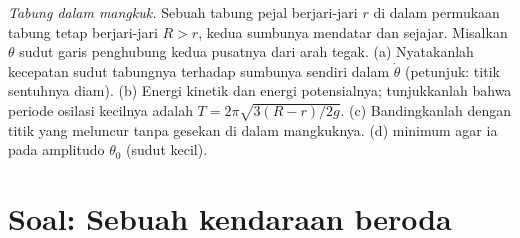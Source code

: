 \begin{exercise}[$\star\star\star$]\label{exo:b2:rigid-body-mechanics:12}
\emph{Tabung dalam mangkuk.} Sebuah tabung pejal berjari-jari $r$
 di dalam permukaan tabung tetap berjari-jari
$R > r$, kedua sumbunya mendatar dan sejajar. Misalkan $\theta$ sudut
garis penghubung kedua pusatnya dari arah tegak. (a) Nyatakanlah
kecepatan sudut tabungnya terhadap sumbunya sendiri dalam $\dot\theta$
(petunjuk: titik sentuhnya diam). (b) Energi kinetik dan energi
potensialnya; tunjukkanlah bahwa periode osilasi kecilnya adalah
$T = 2\pi\sqrt{3(R - r)/2g}$. (c) Bandingkanlah dengan titik yang
meluncur tanpa gesekan di dalam mangkuknya. (d)  minimum
agar ia  pada amplitudo $\theta_0$
(sudut kecil).
\end{exercise}

\section{Soal: Sebuah kendaraan beroda}

